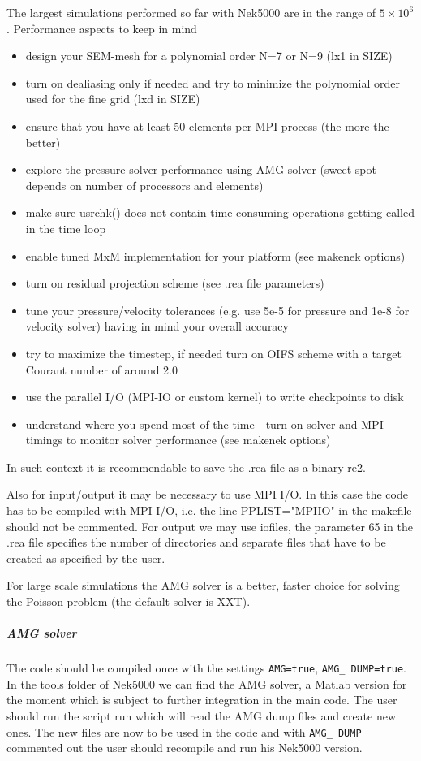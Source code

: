 The largest simulations performed so far with Nek5000 are in the range of \(5\times 10^6\). 
Performance aspects to keep in mind
\begin{itemize}
\item design your SEM-mesh for a polynomial order N=7 or N=9 (lx1 in SIZE)
\item turn on dealiasing only if needed and try to minimize the polynomial order used for the fine grid (lxd in SIZE)
\item ensure that you have at least 50 elements per MPI process (the more the better)
\item explore the pressure solver performance using AMG solver (sweet spot depends on number of processors and elements)
\item make sure usrchk() does not contain time consuming operations getting called in the time loop
\item enable tuned MxM implementation for your platform (see makenek options)
\item turn on residual projection scheme (see .rea file parameters)
\item tune your pressure/velocity tolerances (e.g. use 5e-5 for pressure and 1e-8 for velocity solver) having in mind your overall accuracy
\item try to maximize the timestep, if needed turn on OIFS scheme with a target Courant number of around 2.0
\item use the parallel I/O (MPI-IO or custom kernel) to write checkpoints to disk
\item understand where you spend most of the time - turn on solver and MPI timings to monitor solver performance (see makenek options)
\end{itemize}



In such context it is recommendable to save the .rea file as a binary re2. 

Also for input/output it may be necessary to use MPI I/O. In this case the code has to be compiled with MPI I/O, i.e. the line PPLIST="MPIIO" in the makefile should not be commented. For output we may use iofiles, the parameter 65 in the .rea file specifies the number of directories and separate files that have to be created as specified by the user.

For large scale simulations the AMG solver is a better, faster choice for solving the Poisson problem (the default solver is XXT).

\subparagraph*{AMG solver}
The code should be compiled once with the settings \texttt{AMG=true}, \texttt{AMG\_ DUMP=true}. In the tools folder of Nek5000 we can find the AMG solver, a Matlab version for the moment which is subject to further integration in the main code. The user should run the script run which will read the AMG dump files and create new ones. The new files are now to be used in the code and with \texttt{AMG\_ DUMP} commented out the user should recompile and run his Nek5000 version.

